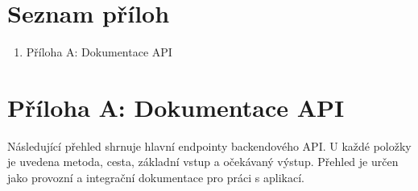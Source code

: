 \documentclass[12pt,a4paper]{report}
\begin{document}
\clearpage
\chapter*{Seznam příloh}
\begin{enumerate}
  \item Příloha A: Dokumentace API \dotfill \pageref{appendix-api}
\end{enumerate}

\clearpage
{}
\chapter*{Příloha A: Dokumentace API}
\label{appendix-api}
\scriptsize
\setlength{\tabcolsep}{3pt}
Následující přehled shrnuje hlavní endpointy backendového API. U každé položky je uvedena metoda, cesta, základní vstup a očekávaný výstup. Přehled je určen jako provozní a integrační dokumentace pro práci s aplikací.
\end{document}
